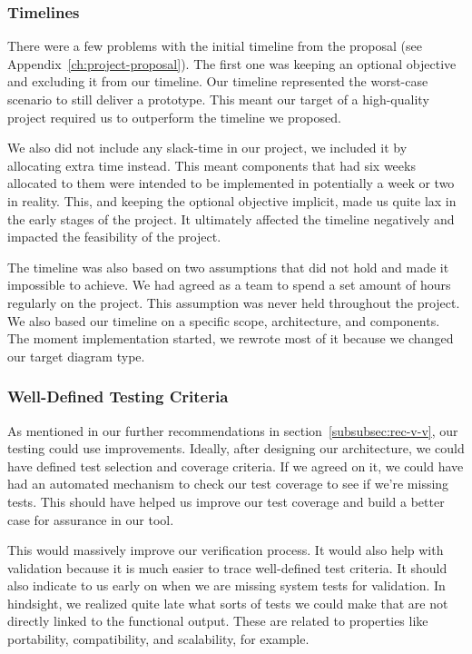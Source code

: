 \subsubsection{Timelines}
There were a few problems with the initial timeline from the proposal (see Appendix~\ref{ch:project-proposal}).
The first one was keeping an optional objective and excluding it from our timeline.
Our timeline represented the worst-case scenario to still deliver a prototype.
This meant our target of a high-quality project required us to outperform the timeline we proposed.

We also did not include any slack-time in our project, we included it by allocating extra time instead.
This meant components that had six weeks allocated to them were intended to be implemented in potentially a week or two in reality.
This, and keeping the optional objective implicit, made us quite lax in the early stages of the project.
It ultimately affected the timeline negatively and impacted the feasibility of the project.

The timeline was also based on two assumptions that did not hold and made it impossible to achieve.
We had agreed as a team to spend a set amount of hours regularly on the project.
This assumption was never held throughout the project.
We also based our timeline on a specific scope, architecture, and components.
The moment implementation started, we rewrote most of it because we changed our target diagram type.

\subsubsection{Well-Defined Testing Criteria}
As mentioned in our further recommendations in section~\ref{subsubsec:rec-v-v}, our testing could use improvements.
Ideally, after designing our architecture, we could have defined test selection and coverage criteria.
If we agreed on it, we could have had an automated mechanism to check our test coverage to see if we're missing tests.
This should have helped us improve our test coverage and build a better case for assurance in our tool.

This would massively improve our verification process.
It would also help with validation because it is much easier to trace well-defined test criteria.
It should also indicate to us early on when we are missing system tests for validation.
In hindsight, we realized quite late what sorts of tests we could make that are not directly linked to the functional output.
These are related to properties like portability, compatibility, and scalability, for example.